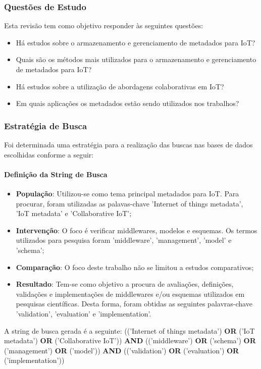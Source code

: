 \subsubsection{Questões de Estudo}
\quad Esta revisão tem como objetivo responder às seguintes questões:
\begin{itemize}
  \item Há estudos sobre o armazenamento e gerenciamento de metadados para \acrlong{IoT}?
  \item Quais são os métodos mais utilizados para o armazenamento e gerenciamento de metadados para \acrshort{IoT}?
  \item Há estudos sobre a utilização de abordagens colaborativas em \acrlong{IoT}?
  \item Em quais aplicações os metadados estão sendo utilizados nos trabalhos?
\end{itemize}

\subsubsection{Estratégia de Busca}
\quad Foi determinada uma estratégia para a realização das buscas nas bases de dados escolhidas conforme a seguir:

\paragraph{Definição da String de Busca}
\begin{itemize}
  \item \textbf{População}: Utilizou-se como tema principal metadados para \acrshort{IoT}. Para procurar, foram utilizadas as palavas-chave 'Internet of things metadata', 'IoT metadata' e 'Collaborative IoT';
  \item \textbf{Intervenção}: O foco é verificar middlewares, modelos e esquemas. Os termos utilizados para pesquisa foram 'middleware', 'management', 'model' e 'schema';
  \item \textbf{Comparação}: O foco deste trabalho não se limitou a estudos comparativos;
  \item \textbf{Resultado}: Tem-se como objetivo a procura de avaliações, definições, validações e implementações de middlewares e/ou esquemas utilizados em pesquisas científicas. Desta forma, foram obtidas as seguintes palavras-chave
  'validation', 'evaluation' e 'implementation'.
\end{itemize}

\quad A string de busca gerada é a seguinte:
(('Internet of things metadata') \textbf{OR} ('IoT metadata') \textbf{OR} ('Collaborative IoT')) \textbf{AND} (('middleware') \textbf{OR} ('schema') \textbf{OR} ('management') \textbf{OR} ('model')) \textbf{AND} (('validation') \textbf{OR} ('evaluation') \textbf{OR} ('implementation'))

